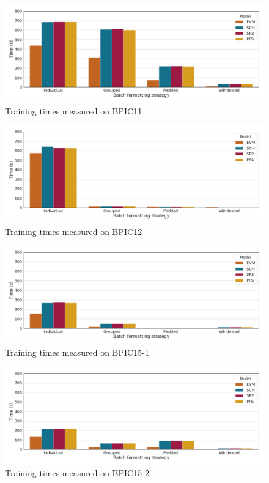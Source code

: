 \begin{figure}
    \centering
    \includegraphics[width=\textwidth]{gfx/bpic2011/train_timings.png}
    \caption{Training times measured on BPIC11~\cite{BPIC2011}}
    \label{fig:BPIC11-training-timings}
\end{figure}
\begin{figure}
    \centering
    \includegraphics[width=\textwidth]{gfx/bpic2012/train_timings.png}
    \caption{Training times measured on BPIC12~\cite{BPIC2012}}
    \label{fig:BPIC12-training-timings}
\end{figure}
\begin{figure}
    \centering
    \includegraphics[width=\textwidth]{gfx/bpic2015_1/train_timings.png}
    \caption{Training times measured on BPIC15-1~\cite{BPIC2015}}
    \label{fig:BPIC15-1-training-timings}
\end{figure}
\begin{figure}
    \centering
    \includegraphics[width=\textwidth]{gfx/bpic2015_2/train_timings.png}
    \caption{Training times measured on BPIC15-2~\cite{BPIC2015}}
    \label{fig:BPIC15-2-training-timings}
\end{figure}
